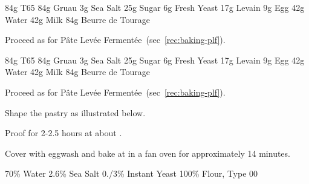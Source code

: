 \label{rec:baking-crossiant}

\begin{ingreds}
	84g T65
	84g Gruau
	3g Sea Salt
	25g Sugar
	6g Fresh Yeast
	17g Levain
	9g Egg
	42g Water
	42g Milk
	84g Beurre de Tourage
\end{ingreds}

\begin{method}[]
Proceed as for P\^ate Lev\'ee Ferment\'ee~(sec~\ref{rec:baking-plf}).

\end {method}

\label{rec:baking-pain-au-chocolat}

\begin{ingreds}
	84g T65
	84g Gruau
	3g Sea Salt
	25g Sugar
	6g Fresh Yeast
	17g Levain
	9g Egg
	42g Water
	42g Milk
	84g Beurre de Tourage
\end{ingreds}

\begin{method}[]
Proceed as for P\^ate Lev\'ee Ferment\'ee~(sec~\ref{rec:baking-plf}).

Shape the pastry as illustrated below.

Proof for 2-2.5 hours at about .

Cover with eggwash and bake at  in a fan oven for approximately 14 minutes.





\end {method}


\label{rec:pizza-dough-napoletan}

\begin{ingreds}
	70\% Water
	2.6\% Sea Salt
	0./3\% Instant Yeast
	100\% Flour, Type 00
\end{ingreds}

\label{rec:pizza-margherita}

